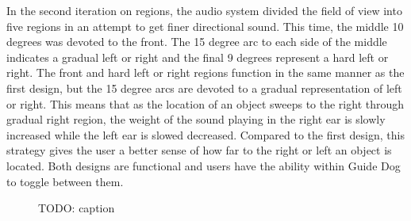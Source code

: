 In the second iteration on regions, the audio system divided the field of view
into five regions in an attempt to get finer directional sound. This time, the
middle 10 degrees was devoted to the front. The 15 degree arc to each side of
the middle indicates a gradual left or right and the final 9 degrees represent
a hard left or right. The front and hard left or right regions function in the
same manner as the first design, but the 15 degree arcs are devoted to a gradual
representation of left or right. This means that as the location of an object
sweeps to the right through gradual right region, the weight of the sound playing in the
right ear is slowly increased while the left ear is slowed decreased. Compared to the first design, this
strategy gives the user a better sense of how far to the right or left an object
is located. Both designs are functional and users
have the ability within Guide Dog to toggle between them.

\begin{figure}
\caption{TODO: caption}
\label{fig:regions}
\end{figure}
